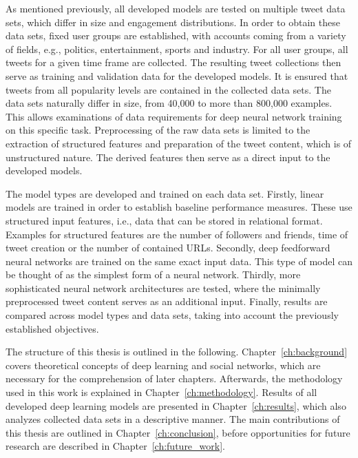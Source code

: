 As mentioned previously, all developed models are tested on multiple tweet data
sets, which differ in size and engagement distributions.
In order to obtain these data sets, fixed user groups are established, with accounts coming from a variety
of fields, e.g., politics, entertainment, sports and industry.
For all user groups, all tweets for a given time frame are collected.
The resulting tweet collections then serve as training and validation data for
the developed models.
It is ensured that tweets from all popularity levels are contained in the
collected data sets.
The data sets naturally differ in size, from 40,000 to more than 800,000 examples.
This allows examinations of data requirements for deep neural network training
on this specific task.
Preprocessing of the raw data sets is limited to the extraction of structured
features and preparation of the tweet content, which is of unstructured nature.
The derived features then serve as a direct input to the developed models.

The model types are developed and trained on each data set.
Firstly, linear models are trained in order to establish baseline performance
measures.
These use structured input features, i.e., data that can be stored in
relational format.
Examples for structured features are the number of followers and friends, time
of tweet creation or the number of contained URLs.
Secondly, deep feedforward neural networks are trained on the same exact input
data.
This type of model can be thought of as the simplest form of a neural network.
Thirdly, more sophisticated neural network architectures are tested, where
the minimally preprocessed tweet content serves as an additional input.
Finally, results are compared across model types and data sets, taking into
account the previously established objectives.

The structure of this thesis is outlined in the following.
Chapter~\ref{ch:background} covers theoretical concepts of deep learning and
social networks, which are necessary for the comprehension of later chapters.
Afterwards, the methodology used in this work is explained in Chapter~\ref{ch:methodology}.
Results of all developed deep learning models are presented in Chapter~\ref{ch:results},
which also analyzes collected data sets in a descriptive manner.
The main contributions of this thesis are outlined in Chapter~\ref{ch:conclusion},
before opportunities for future research are described in Chapter~\ref{ch:future_work}.
